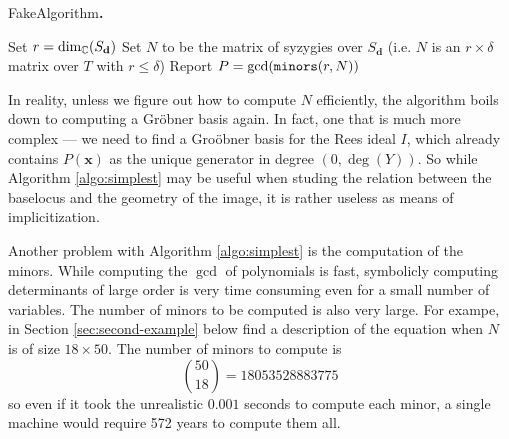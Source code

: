 \documentclass[fleqn,reqno]{amsart}
\numberwithin{first}{chapter}
\begin{document}
\begin{algorithm} {\sc FakeAlgorithm\bf.}
\label{algo:simplest}
\begin{algorithmic}
  \State Set $r=\dim_{\mathbb{C}}(S_{\mathbf d})$
  \State Set $N$ to be the matrix of syzygies over $S_{\mathbf d}$ (i.e. $N$ is an $r\times\delta$ matrix over $T$ with $r\leq\delta$)
  \State Report $P=\gcd(\mathop{\tt minors}(r,N))$
\end{algorithmic}
\end{algorithm}

\begin{paragraf}
\label{par:problem-computing-rees-gb}
In reality, unless we figure out how to compute $N$ efficiently,
the algorithm boils down to computing a Gr\"obner basis again.
In fact, one that is much more complex ---
we need to find a Gro\"{o}bner basis for the Rees ideal $I$,
which already contains $P(\mathbf x)$ as the unique generator in degree $(0,\deg(Y))$.
So while Algorithm \ref{algo:simplest} may be useful when studing
the relation between the baselocus and the geometry of the image,
it is rather useless as means of implicitization.
\end{paragraf}

\begin{paragraf}
\label{par:problem-too-many-minors}
Another problem with Algorithm \ref{algo:simplest} is the computation of the minors.
While computing the $\gcd$ of polynomials is fast,
symbolicly computing determinants of large order is very time consuming even for a small number of variables.
The number of minors to be computed is also very large.
For exampe, in Section \ref{sec:second-example} below find a description of the equation when $N$ is of size
$18\times50$.
The number of minors to compute is
\[
\binom{50}{18}=18053528883775
\]
so even if it took the unrealistic $0.001$ seconds to compute each minor,
a single machine would require 572 years to compute them all.
\end{paragraf}
\end{document}
